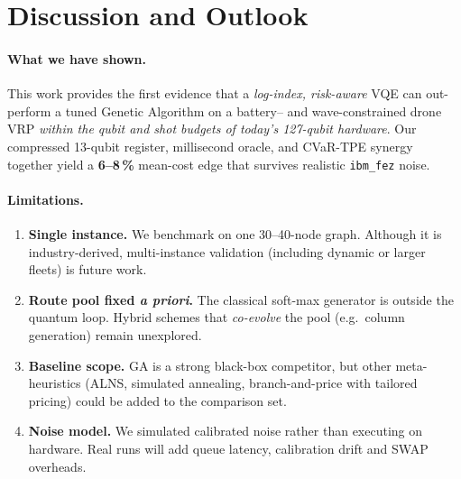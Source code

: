 \section{Discussion and Outlook}
\label{sec:discussion}

\paragraph{What we have shown.}
This work provides the first evidence that a \emph{log-index, risk-aware}
VQE can out-perform a tuned Genetic Algorithm on a
battery– and wave-constrained drone VRP
\emph{within the qubit and shot budgets of today’s 127-qubit hardware}.
Our compressed 13-qubit register, millisecond oracle,
and CVaR-TPE synergy together yield a \textbf{6–8\,\%} mean-cost edge
that survives realistic \texttt{ibm\_fez} noise.

\paragraph{Limitations.}
\begin{enumerate}
    \item \textbf{Single instance.}  We benchmark on one 30–40-node graph.
          Although it is industry-derived, multi-instance validation
          (including dynamic or larger fleets) is future work.
    \item \textbf{Route pool fixed \emph{a priori}.}
          The classical soft-max generator is outside the quantum loop.
          Hybrid schemes that \emph{co-evolve} the pool (e.g.\ column
          generation) remain unexplored.
    \item \textbf{Baseline scope.}  GA is a strong black-box competitor,
          but other meta-heuristics (ALNS, simulated annealing, branch-and-price
          with tailored pricing) could be added to the comparison set.
    \item \textbf{Noise model.}  We simulated calibrated noise rather than
          executing on hardware.  Real runs will add queue latency,
          calibration drift and SWAP overheads.
\end{enumerate}

